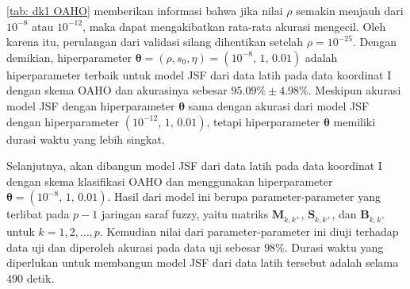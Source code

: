 \noindent \ref{tab: dk1 OAHO} memberikan informasi bahwa jika nilai $\rho$ semakin menjauh dari $10^{-8}$ atau $10^{-12}$, maka dapat mengakibatkan rata-rata akurasi mengecil. Oleh karena itu, perulangan dari validasi silang dihentikan setelah $\rho=10^{-25}$. Dengan demikian, hiperparameter $\boldsymbol{\theta} = (\rho, s_0,\eta) = (10^{-8}\text{,  } \allowbreak 1\text{,  } \allowbreak \num{0,01})$ adalah hiperparameter terbaik untuk model JSF dari data latih pada data koordinat I dengan skema OAHO dan akurasinya sebesar $\num{95,09}\%\pm \num{4,98}\%$. Meskipun akurasi model JSF dengan hiperparameter $\boldsymbol{\theta}$ sama dengan akurasi dari model JSF dengan hiperparameter $(10^{-12}\text{,  } \allowbreak 1\text{,  } \allowbreak \num{0,01})$, tetapi hiperparameter $\boldsymbol{\theta}$ memiliki durasi waktu yang lebih singkat.

\noindent Selanjutnya, akan dibangun model JSF dari data latih pada data koordinat I dengan skema klasifikasi OAHO dan menggunakan hiperparameter $\boldsymbol{\theta} = (10^{-8}\text{,  } \allowbreak 1\text{,  } \allowbreak \num{0,01})$. Hasil dari model ini berupa parameter-parameter yang terlibat pada $p-1$ jaringan saraf fuzzy, yaitu matriks $\mathbf{M}_{k,k^+}$, $\mathbf{S}_{k,k^+}$, dan $\mathbf{B}_{k,k^+}$ untuk $k=1,2,\ldots,p$. Kemudian nilai dari parameter-parameter ini diuji terhadap data uji dan diperoleh akurasi pada data uji sebesar $98\%$. Durasi waktu yang diperlukan untuk membangun model JSF dari data latih tersebut adalah selama $490$ detik.

